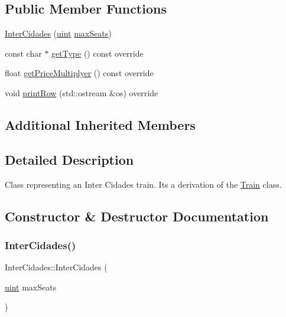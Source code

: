 \subsection*{Public Member Functions}
\begin{DoxyCompactItemize}
\item 
\mbox{\hyperlink{classInterCidades_a461d109be503396d4c66a5016438bb26}{Inter\+Cidades}} (\mbox{\hyperlink{project__utils_8h_a91ad9478d81a7aaf2593e8d9c3d06a14}{uint}} \mbox{\hyperlink{classTrain_a2954421b3beb871526ca169beca4c430}{max\+Seats}})
\item 
const char $\ast$ \mbox{\hyperlink{classInterCidades_a19eb37a1538d16247a7ba44e4a3c367b}{get\+Type}} () const override
\item 
float \mbox{\hyperlink{classInterCidades_ae48f10e5086edea5b9797ae12ab0867f}{get\+Price\+Multiplyer}} () const override
\item 
void \mbox{\hyperlink{classInterCidades_af3a946b18bb99a7d1372d2dad4588639}{print\+Row}} (std\+::ostream \&os) override
\end{DoxyCompactItemize}
\subsection*{Additional Inherited Members}


\subsection{Detailed Description}
Class representing an Inter Cidades train. Its a derivation of the \mbox{\hyperlink{classTrain}{Train}} class. 

\subsection{Constructor \& Destructor Documentation}
\mbox{\label{classInterCidades_a461d109be503396d4c66a5016438bb26}} 
\subsubsection{\texorpdfstring{Inter\+Cidades()}{InterCidades()}}
{\footnotesize\ttfamily Inter\+Cidades\+::\+Inter\+Cidades (\begin{DoxyParamCaption}\item[{\mbox{\hyperlink{project__utils_8h_a91ad9478d81a7aaf2593e8d9c3d06a14}{uint}}}]{max\+Seats }\end{DoxyParamCaption})}

